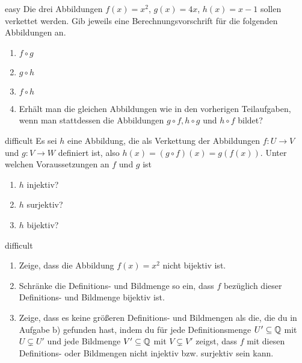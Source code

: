 \documentclass[../abbildungen.tex]{subfiles}
\begin{document}
\begin{exercise}{easy}
    Die drei Abbildungen $f(x)=x^2$, $g(x)=4x$, $h(x)=x-1$ sollen verkettet werden. Gib jeweils eine Berechnungsvorschrift für die folgenden Abbildungen an.
    \begin{enumerate}
        \item $f\circ g$
        \item $g\circ h$
        \item $f\circ h$
        \item Erhält man die gleichen Abbildungen wie in den vorherigen Teilaufgaben, wenn man stattdessen die Abbildungen $g\circ f, h\circ g$ und $h\circ f$ bildet? 
    \end{enumerate}
\end{exercise}

\begin{exercise}{difficult}
    Es sei $h$ eine Abbildung, die als Verkettung der Abbildungen $f\colon U\rightarrow V$ und $g\colon V\rightarrow W$ definiert ist, also $h(x)=(g\circ f)(x)=g(f(x))$. Unter welchen Voraussetzungen an $f$ und $g$ ist
    \begin{enumerate}
        \item $h$ injektiv?
        \item $h$ surjektiv?
        \item $h$ bijektiv?
    \end{enumerate}
\end{exercise}

\begin{exercise}{difficult}
    \begin{enumerate}
        \item Zeige, dass die Abbildung $f(x)=x^2$ nicht bijektiv ist.
        \item Schränke die Definitions- und Bildmenge so ein, dass $f$ bezüglich dieser Definitions- und Bildmenge bijektiv ist.
        \item Zeige, dass es keine größeren Definitions- und Bildmengen als die, die du in Aufgabe b) gefunden hast, indem du für jede Definitionsmenge $U'\subseteq\mathbb{Q}$ mit $U\subsetneq U'$ und jede Bildmenge $V'\subseteq\mathbb{Q}$ mit $V\subsetneq V'$ zeigst, dass $f$ mit diesen Definitions- oder Bildmengen nicht injektiv bzw. surjektiv sein kann.
    \end{enumerate}
\end{exercise}
\end{document}
